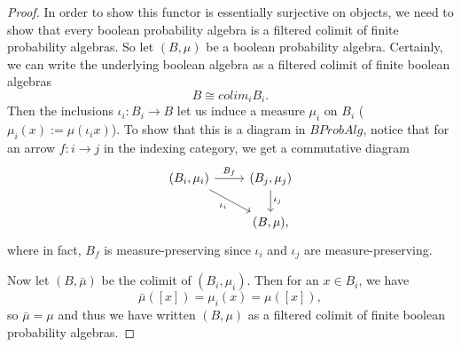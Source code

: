\documentclass[a4paper,draft]{amsproc}
\theoremstyle{plain}
\theoremstyle{definition}
\theoremstyle{remark}
\numberwithin{equation}{section}
\begin{document}
\begin{proof}
In order to show this functor is essentially surjective on objects, we need to show that every boolean probability algebra is a filtered colimit of finite probability algebras. So let $(B, \mu)$ be a boolean probability algebra. Certainly, we can write the underlying boolean algebra as a filtered colimit of finite boolean algebras
\[
B \cong colim_i B_i.
\]
Then the inclusions $\iota_i: B_i \to B$ let us induce a measure $\mu_i$ on $B_i$ ($\mu_i(x) := \mu(\iota_i x)$). To show that this is a diagram in $BProbAlg$, notice that for an arrow $f: i \to j$ in the indexing category, we get a commutative diagram
\[
\begin{tikzcd}
{(B_i,\mu_i)} \arrow[r, "B_f"] \arrow[rd, "\iota_i"'] & {(B_j,\mu_j)} \arrow[d, "\iota_j"] \\
                                                      & {(B,\mu)}                         ,
\end{tikzcd}
\]
where in fact, $B_f$ is measure-preserving since $\iota_i$ and $\iota_j$ are measure-preserving.

Now let $(B,\bar{\mu})$ be the colimit of $(B_i, \mu_i)$. Then for an $x \in B_i$, we have
\[
\bar{\mu}([x]) = \mu_i(x) = \mu([x]),
\]
so $\bar{\mu} = \mu$ and thus we have written $(B, \mu)$ as a filtered colimit of finite boolean probability algebras.
\end{proof}
\end{document}
